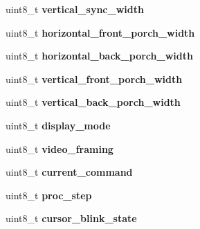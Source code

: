 \begin{DoxyCompactItemize}
\item 
\hypertarget{structPC98__GDC__state_a528d52a66abb61859d8d866463b0ddba}{uint8\-\_\-t {\bfseries vertical\-\_\-sync\-\_\-width}}\label{structPC98__GDC__state_a528d52a66abb61859d8d866463b0ddba}

\item 
\hypertarget{structPC98__GDC__state_a8a30c42b0ec0187669fd62bb8e5ee1fd}{uint8\-\_\-t {\bfseries horizontal\-\_\-front\-\_\-porch\-\_\-width}}\label{structPC98__GDC__state_a8a30c42b0ec0187669fd62bb8e5ee1fd}

\item 
\hypertarget{structPC98__GDC__state_afed5fbe810687a114231165d2035320f}{uint8\-\_\-t {\bfseries horizontal\-\_\-back\-\_\-porch\-\_\-width}}\label{structPC98__GDC__state_afed5fbe810687a114231165d2035320f}

\item 
\hypertarget{structPC98__GDC__state_a09d208aa4df7a0aa802695c76e55e84d}{uint8\-\_\-t {\bfseries vertical\-\_\-front\-\_\-porch\-\_\-width}}\label{structPC98__GDC__state_a09d208aa4df7a0aa802695c76e55e84d}

\item 
\hypertarget{structPC98__GDC__state_ae2979bda1db66e6cd96a9374f50c8460}{uint8\-\_\-t {\bfseries vertical\-\_\-back\-\_\-porch\-\_\-width}}\label{structPC98__GDC__state_ae2979bda1db66e6cd96a9374f50c8460}

\item 
\hypertarget{structPC98__GDC__state_afeee708ec68e7b11dfb018eef6112a4a}{uint8\-\_\-t {\bfseries display\-\_\-mode}}\label{structPC98__GDC__state_afeee708ec68e7b11dfb018eef6112a4a}

\item 
\hypertarget{structPC98__GDC__state_a58177cd0a41ec852d53db1d668420089}{uint8\-\_\-t {\bfseries video\-\_\-framing}}\label{structPC98__GDC__state_a58177cd0a41ec852d53db1d668420089}

\item 
\hypertarget{structPC98__GDC__state_aff0017111dc87de5612eb90cc4f60e78}{uint8\-\_\-t {\bfseries current\-\_\-command}}\label{structPC98__GDC__state_aff0017111dc87de5612eb90cc4f60e78}

\item 
\hypertarget{structPC98__GDC__state_a510fb5f8bab0480ad0862a28bcbaa38b}{uint8\-\_\-t {\bfseries proc\-\_\-step}}\label{structPC98__GDC__state_a510fb5f8bab0480ad0862a28bcbaa38b}

\item 
\hypertarget{structPC98__GDC__state_aac0268546867b0e7cac68aa263afdace}{uint8\-\_\-t {\bfseries cursor\-\_\-blink\-\_\-state}}\label{structPC98__GDC__state_aac0268546867b0e7cac68aa263afdace}


\end{DoxyCompactItemize}
